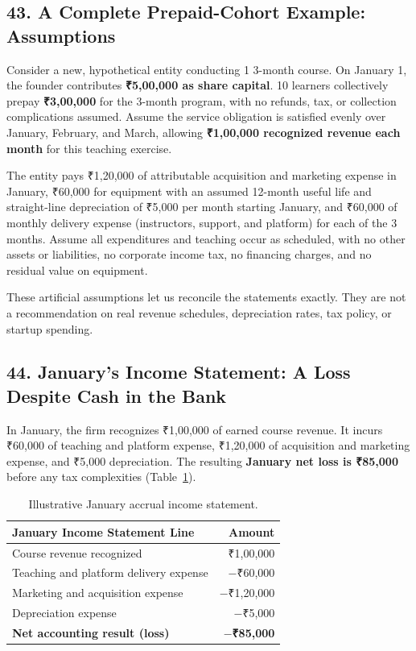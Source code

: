 \subsection*{43. A Complete Prepaid-Cohort Example: Assumptions}

Consider a new, hypothetical entity conducting 1 3-month course. On January 1, the founder contributes \textbf{₹5,00,000 as share capital}. 10 learners collectively prepay \textbf{₹3,00,000} for the 3-month program, with no refunds, tax, or collection complications assumed. Assume the service obligation is satisfied evenly over January, February, and March, allowing \textbf{₹1,00,000 recognized revenue each month} for this teaching exercise.

The entity pays ₹1,20,000 of attributable acquisition and marketing expense in January, ₹60,000 for equipment with an assumed 12-month useful life and straight-line depreciation of ₹5,000 per month starting January, and ₹60,000 of monthly delivery expense (instructors, support, and platform) for each of the 3 months. Assume all expenditures and teaching occur as scheduled, with no other assets or liabilities, no corporate income tax, no financing charges, and no residual value on equipment.

These artificial assumptions let us reconcile the statements exactly. They are not a recommendation on real revenue schedules, depreciation rates, tax policy, or startup spending.

\subsection*{44. January's Income Statement: A Loss Despite Cash in the Bank}

In January, the firm recognizes ₹1,00,000 of earned course revenue. It incurs ₹60,000 of teaching and platform expense, ₹1,20,000 of acquisition and marketing expense, and ₹5,000 depreciation. The resulting \textbf{January net loss is ₹85,000} before any tax complexities (Table~\ref{tab:january-income-statement}).

\begin{table}[htbp]
\centering
\small
\begin{tabularx}{\columnwidth}{Xr}
\toprule
\textbf{January Income Statement Line} & \textbf{Amount} \\
\midrule
Course revenue recognized & ₹1,00,000 \\
Teaching and platform delivery expense & $-$₹60,000 \\
Marketing and acquisition expense & $-$₹1,20,000 \\
Depreciation expense & $-$₹5,000 \\
\midrule
\textbf{Net accounting result (loss)} & \textbf{$-$₹85,000} \\
\bottomrule
\end{tabularx}
\caption{Illustrative January accrual income statement.}
\label{tab:january-income-statement}
\end{table}

